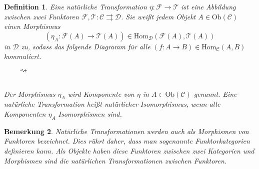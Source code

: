 \documentclass[a4paper, 11pt]{scrartcl}
\newcommand{\Hom}{\text{Hom}}
\newcommand{\Ob}{\text{Ob}}
\theoremstyle{basicstyle}
\newtheorem{definition}{Definition}[section]
\newtheorem{bemerkung}[definition]{Bemerkung}
\begin{document}
    \begin{definition}
        Eine \emph{natürliche Transformation} \(\eta : \mathcal{F} \to \mathcal{T}\) ist eine Abbildung zwischen zwei Funktoren \(\mathcal{F}, \mathcal{T}: \mathcal{C} \rightrightarrows \mathcal{D}\).
        Sie weißt jedem Objekt \(A \in \Ob(\mathcal{C})\) einen Morphismus
        \[(\eta_A : \mathcal{F}(A) \to \mathcal{T}(A)) \in \Hom_\mathcal{D}(\mathcal{F}(A), \mathcal{T}(A))\] in \(\mathcal{D}\) zu, sodass das folgende Diagramm für alle \((f: A \to B) \in \Hom_{\mathcal{C}}(A,B)\) kommutiert.
        \begin{figure*}[ht!]
            \centering
            \(\qquad\rightsquigarrow\qquad\)
        \end{figure*} \\
        Der Morphismus \(\eta_A\) wird \emph{Komponente} von \(\eta\) in \(A \in \Ob(\mathcal{C})\) genannt.
        Eine natürliche Transformation heißt \emph{natürlicher Isomorphismus}, wenn alle Komponenten \(\eta_A\) Isomorphismen sind.
    \end{definition}

    \begin{bemerkung}\label{bem:1}
        Natürliche Transformationen werden auch als \emph{Morphismen von Funktoren} bezeichnet.
        Dies rührt daher, dass man sogenannte \emph{Funktorkategorien} definieren kann.
        Als Objekte haben diese Funktoren zwischen zwei Kategorien und Morphismen sind die natürlichen Transformationen zwischen Funktoren.
    \end{bemerkung}
\end{document}
